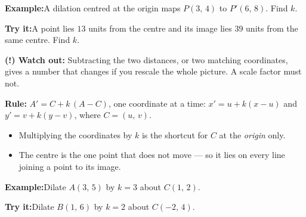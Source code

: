 \documentclass[12pt]{article}
\begin{document}
\begin{examplebox}
\textbf{Example:}\quad A dilation centred at the origin maps $P(3,\,4)$ to
$P'(6,\,8)$. Find $k$.
\end{examplebox}

\begin{tryitbox}
\textbf{Try it:}\quad A point lies $13$ units from the centre and its image lies
$39$ units from the same centre. Find $k$.\\[2pt]
\end{tryitbox}

\begin{watchoutbox}
\textbf{(!) Watch out:} Subtracting the two distances, or two matching
coordinates, gives a number that changes if you rescale the whole picture. A
scale factor must not.
\end{watchoutbox}


\begin{formulabox}
\textbf{Rule:} \quad $A' = C + k\,(A - C)$, one coordinate at a time:
$x' = u + k(x - u)$ and $y' = v + k(y - v)$, where $C = (u,\,v)$.
\begin{itemize}[leftmargin=0.8cm, itemsep=1pt, topsep=2pt]
  \item Multiplying the coordinates by $k$ is the shortcut for $C$ at the
        \emph{origin} only.
  \item The centre is the one point that does not move --- so it lies on every
        line joining a point to its image.
\end{itemize}
\end{formulabox}

\begin{examplebox}
\textbf{Example:}\quad Dilate $A(3,\,5)$ by $k=3$ about $C(1,\,2)$.
\end{examplebox}

\begin{tryitbox}
\textbf{Try it:}\quad Dilate $B(1,\,6)$ by $k=2$ about $C(-2,\,4)$.\\[2pt]
\rotatebox{180}{\footnotesize check: $\ans{4}$ and $\ans{8}$}
\end{tryitbox}
\end{document}
